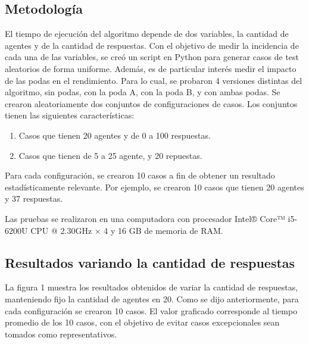 \documentclass{article}
\begin{document}
\subsection{Metodología}

El tiempo de ejecución del algoritmo depende de dos variables, la cantidad de agentes y de la cantidad de respuestas. 
Con el objetivo de medir la incidencia de cada una de las variables, se creó un script en Python para generar casos de test aleatorios de forma uniforme. 
Además, es de particular interés medir el impacto de las podas en el rendimiento. Para lo cual, se probaron 4 versiones distintas del algoritmo, sin podas, con la poda A, con la poda B, y con ambas podas.
Se crearon aleatoriamente dos conjuntos de configuraciones de casos. Los conjuntos tienen las siguientes características:

\begin{enumerate}
	\item Casos que tienen 20 agentes y de 0 a 100 respuestas.
	\item Casos que tienen de 5 a 25 agente, y 20 repuestas.
\end{enumerate}

Para cada configuración, se crearon 10 casos a fin de obtener un resultado estadísticamente relevante. Por ejemplo, se crearon 10 casos que tienen 20 agentes y 37 respuestas.

Las pruebas se realizaron en una computadora con procesador Intel® Core™ i5-6200U CPU @ 2.30GHz × 4 y 16 GB de memoria de RAM.

\subsection{Resultados variando la cantidad de respuestas}

La figura 1 muestra los resultados obtenidos de variar la cantidad de respuestas, manteniendo fijo la cantidad de agentes en 20. Como se dijo anteriormente, para cada configuración se crearon 10 casos. El valor graficado corresponde al tiempo promedio de los 10 casos, con el objetivo de evitar casos excepcionales sean tomados como representativos.

 
\end{document}
